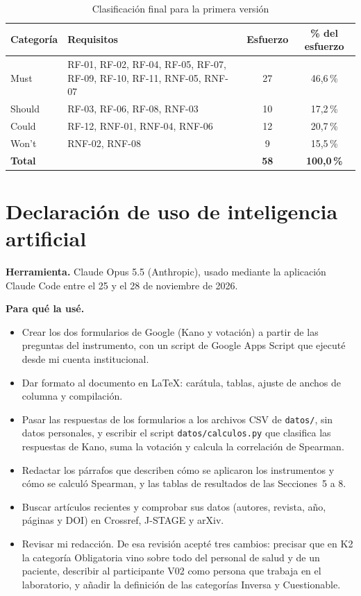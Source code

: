 \documentclass[11pt,a4paper]{article}
\begin{document}
\begin{table}[htbp]
\centering
\caption{Clasificación final para la primera versión}\label{tab:decision}
\begin{tabular}{|l|L{8.4cm}|c|c|}
\hline
\textbf{Categoría} & \textbf{Requisitos} & \textbf{Esfuerzo} & \textbf{\% del esfuerzo}\\
\hline
Must & RF-01, RF-02, RF-04, RF-05, RF-07, RF-09, RF-10, RF-11, RNF-05, RNF-07 & 27 & 46,6\,\%\\
\hline
Should & RF-03, RF-06, RF-08, RNF-03 & 10 & 17,2\,\%\\
\hline
Could & RF-12, RNF-01, RNF-04, RNF-06 & 12 & 20,7\,\%\\
\hline
Won't & RNF-02, RNF-08 & 9 & 15,5\,\%\\
\hline
\textbf{Total} & & \textbf{58} & \textbf{100,0\,\%}\\
\hline
\end{tabular}
\end{table}

\section{Declaración de uso de inteligencia artificial}
\textbf{Herramienta.} Claude Opus 5.5 (Anthropic), usado mediante la aplicación Claude Code entre el 25 y el 28 de noviembre de 2026.

\textbf{Para qué la usé.}
\begin{itemize}
\item Crear los dos formularios de Google (Kano y votación) a partir de las preguntas del instrumento, con un script de Google Apps Script que ejecuté desde mi cuenta institucional.
\item Dar formato al documento en \LaTeX{}: carátula, tablas, ajuste de anchos de columna y compilación.
\item Pasar las respuestas de los formularios a los archivos CSV de \texttt{datos/}, sin datos personales, y escribir el script \texttt{datos/calculos.py} que clasifica las respuestas de Kano, suma la votación y calcula la correlación de Spearman.
\item Redactar los párrafos que describen cómo se aplicaron los instrumentos y cómo se calculó Spearman, y las tablas de resultados de las Secciones~5 a 8.
\item Buscar artículos recientes y comprobar sus datos (autores, revista, año, páginas y DOI) en Crossref, J-STAGE y arXiv.
\item Revisar mi redacción. De esa revisión acepté tres cambios: precisar que en K2 la categoría Obligatoria vino sobre todo del personal de salud y de un paciente, describir al participante V02 como persona que trabaja en el laboratorio, y añadir la definición de las categorías Inversa y Cuestionable.
\end{itemize}
\end{document}

